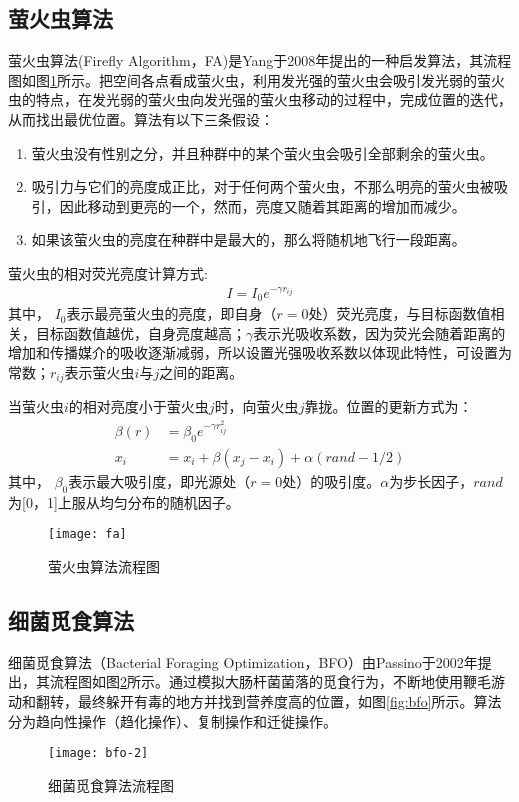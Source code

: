   \subsection{萤火虫算法}
  萤火虫算法(Firefly Algorithm，FA)\cite{fa}是Yang于2008年提出的一种启发算法，其流程图如图\ref{fig:fa}所示。把空间各点看成萤火虫，利用发光强的萤火虫会吸引发光弱的萤火虫的特点，在发光弱的萤火虫向发光强的萤火虫移动的过程中，完成位置的迭代，从而找出最优位置。算法有以下三条假设：
  \begin{enumerate}
    \item {萤火虫没有性别之分，并且种群中的某个萤火虫会吸引全部剩余的萤火虫。}
    \item {吸引力与它们的亮度成正比，对于任何两个萤火虫，不那么明亮的萤火虫被吸引，因此移动到更亮的一个，然而，亮度又随着其距离的增加而减少。}
    \item {如果该萤火虫的亮度在种群中是最大的，那么将随机地飞行一段距离。}
  \end{enumerate}
  萤火虫的相对荧光亮度计算方式:
  \begin{align}
    I=I_0e^{-\gamma r_{ij}}
  \end{align}
  其中， $I_0$表示最亮萤火虫的亮度，即自身（$r=0$处）荧光亮度，与目标函数值相关，目标函数值越优，自身亮度越高；$\gamma$表示光吸收系数，因为荧光会随着距离的增加和传播媒介的吸收逐渐减弱，所以设置光强吸收系数以体现此特性，可设置为常数；$r_{ij}$表示萤火虫$i$与$j$之间的距离。 

  当萤火虫$i$的相对亮度小于萤火虫$j$时，向萤火虫$j$靠拢。位置的更新方式为：
  \begin{align}
    \beta(r)&=\beta_0e^{-\gamma r_{ij}^2} \\
    x_i&=x_i+\beta(x_j-x_i)+\alpha(rand-1/2)
  \end{align}
  其中， $\beta_0$表示最大吸引度，即光源处（$r=0$处）的吸引度。$\alpha$为步长因子，$rand$为[0，1]上服从均匀分布的随机因子。

  \begin{figure}[htbp]
    \centering
    \texttt{[image: fa]}
    \caption{萤火虫算法流程图}
    \label{fig:fa}
  \end{figure}

  \subsection{细菌觅食算法}
  细菌觅食算法（Bacterial Foraging Optimization，BFO）\cite{bfo}由Passino于2002年提出，其流程图如图\ref{fig:bfo-2}所示。通过模拟大肠杆菌菌落的觅食行为，不断地使用鞭毛游动和翻转，最终躲开有毒的地方并找到营养度高的位置，如图\ref{fig:bfo}所示。算法分为趋向性操作（趋化操作）、复制操作和迁徙操作。
  \begin{figure}[htbp]
    \centering
    \texttt{[image: bfo-2]}
    \caption{细菌觅食算法流程图}
    \label{fig:bfo-2}
  \end{figure}
  
